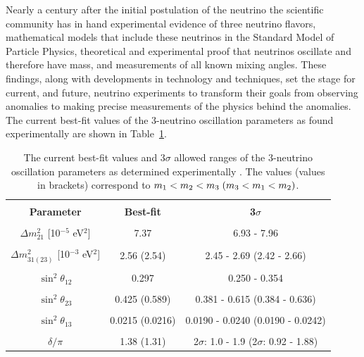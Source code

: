 Nearly a century after the initial postulation of the neutrino the scientific community has in hand experimental evidence of three neutrino flavors, mathematical models that include these neutrinos in the Standard Model of Particle Physics, theoretical and experimental proof that neutrinos oscillate and therefore have mass, and measurements of all known mixing angles.
These findings, along with developments in technology and techniques, set the stage for current, and future, neutrino experiments to transform their goals from observing anomalies to making precise measurements of the physics behind the anomalies.
The current best-fit values of the 3-neutrino oscillation parameters as found experimentally are shown in Table~\ref{tab:ParamValues}.


\begin{table}
	\centering
	\begin{tabular}{ccc}
		\hline
		\vspace{-0.3cm} \\ 
		\textbf{Parameter} & \textbf{Best-fit} & \textbf{3$\sigma$} \vspace{0.1cm} \\ 
		\hline 
		\vspace{-0.3cm} \\
		$\Delta m^2_{21}$ [10$^{-5}$ eV$^2$] & 7.37 & 6.93 - 7.96 \\ 
		\vspace{-0.3cm} \\
		$\Delta m^2_{31(23)}$ [10$^{-3}$ eV$^2$] & 2.56 (2.54) & 2.45 - 2.69 (2.42 - 2.66) \\ 
		\vspace{-0.3cm} \\
		$\sin^2\theta_{12}$  & 0.297 & 0.250 - 0.354 \\ 
		\vspace{-0.3cm} \\
		$\sin^2\theta_{23}$  & 0.425 (0.589) & 0.381 - 0.615 (0.384 - 0.636) \\ 
		\vspace{-0.3cm} \\
		$\sin^2\theta_{13}$  & 0.0215 (0.0216) & 0.0190 - 0.0240 (0.0190 - 0.0242) \\ 
		\vspace{-0.3cm} \\
		$\delta/\pi$ & 1.38 (1.31) & 2$\sigma$: 1.0 - 1.9 (2$\sigma$: 0.92 - 1.88) \\ 
		\hline 
	\end{tabular} 
	\caption[Neutrino Oscillation Parameters]{The current best-fit values and 3$\sigma$ allowed ranges of the 3-neutrino oscillation parameters as determined experimentally \cite{PDG}. The values (values in brackets) correspond to $m_1 < m_2 < m_3 \hspace{0.1cm} (m_3 < m_1 < m_2)$.}
	\label{tab:ParamValues}
\end{table}

